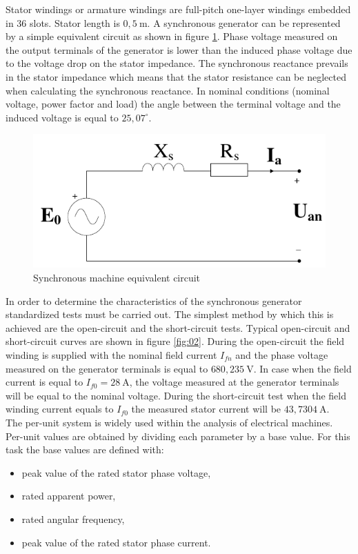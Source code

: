 \documentclass{article}
\begin{document}
Stator windings or armature windings are full-pitch one-layer windings embedded in 36 slots. Stator length is $0,5\ \mathrm{m}$. A synchronous generator can be represented by a simple equivalent circuit as shown in figure \ref{fig:01}. Phase voltage measured on the output terminals of the generator is lower than the induced phase voltage due to the voltage drop on the stator impedance. The synchronous reactance prevails in the stator impedance which means that the stator resistance can be neglected when calculating the synchronous reactance. In nominal conditions (nominal voltage, power factor and load) the angle between the terminal voltage and the induced voltage is equal to $25,07^{\circ}$.
\begin{figure}[!htb]
			\centering
			\includegraphics{Images/EquivalentCircuit.pdf}
			\caption{Synchronous machine equivalent circuit}
			\label{fig:01}
\end{figure}
In order to determine the characteristics of the synchronous generator standardized tests must be carried out. The simplest method by which this is achieved are the open-circuit and the short-circuit tests. Typical open-circuit and short-circuit curves are shown in figure \ref{fig:02}. During the open-circuit the field winding is supplied with the nominal field current $I_{fn}$ and the phase voltage measured on the generator terminals is equal to $680,235\ \mathrm{V}$. In case when the field current is equal to $I_{f0} = 28 \ \mathrm{A}$, the voltage measured at the generator terminals will be equal to the nominal voltage. During the short-circuit test when the field winding current equals to $I_{f0}$ the measured stator current will be $43, 7304\ \mathrm{A}$. 
\\The per-unit system is widely used within the analysis of electrical machines. Per-unit values are obtained by dividing each parameter by a base value. For this task the base values are defined with:
\begin{itemize}
    \item peak value of the rated stator phase voltage,
    \item rated apparent power,
    \item rated angular frequency,
    \item peak value of the rated stator phase current.
\end{itemize}
\end{document}

